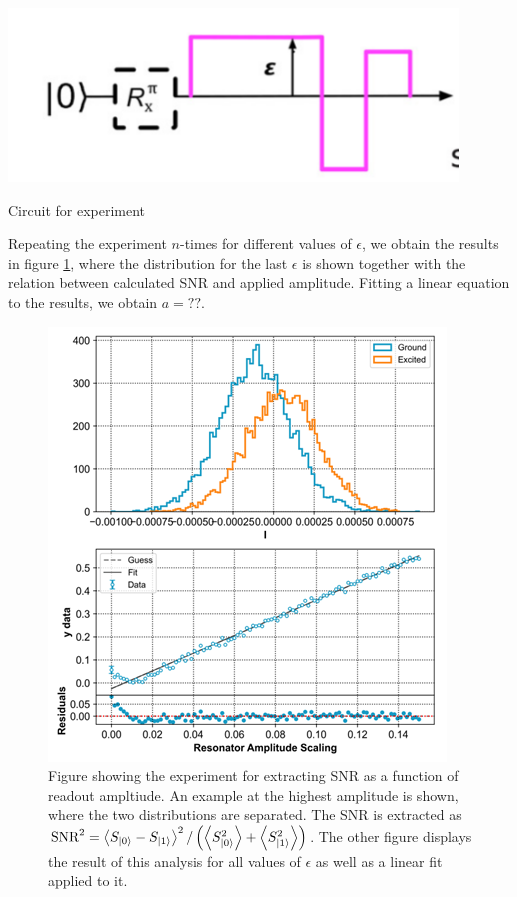 \begin{marginfigure}
    \centering
    \includegraphics{Figs/calibrations/efficiency/experiment_circuit_SNR.png}
    \caption{Circuit for experiment}
    \label{fig:efficiency_SNR_experiment}
\end{marginfigure}

Repeating the experiment $n$-times for different values of $\epsilon$, we obtain the results in figure \ref{fig:effiiency_results_SNR}, where the distribution for the last $\epsilon$ is shown together with the relation between calculated SNR and applied amplitude. Fitting a linear equation to the results, we obtain $a = ??$.  

\begin{figure}
    \centering
    \includegraphics{Figs/calibrations/efficiency/SNR_result.png}
    \caption{Figure showing the experiment for extracting SNR as a function of readout ampltiude. An example at the highest amplitude is shown, where the two distributions are separated. The SNR is extracted as $\text{SNR}^2 = \expval{S_{\ket{0}} - S_{\ket{1}}}^2/\left(\expval{S^2_{\ket{0}}} +\expval{S^2_{\ket{1}}}\right)$. The other figure displays the result of this analysis for all values of $\epsilon$ as well as a linear fit applied to it.}
    \label{fig:effiiency_results_SNR}
\end{figure}



